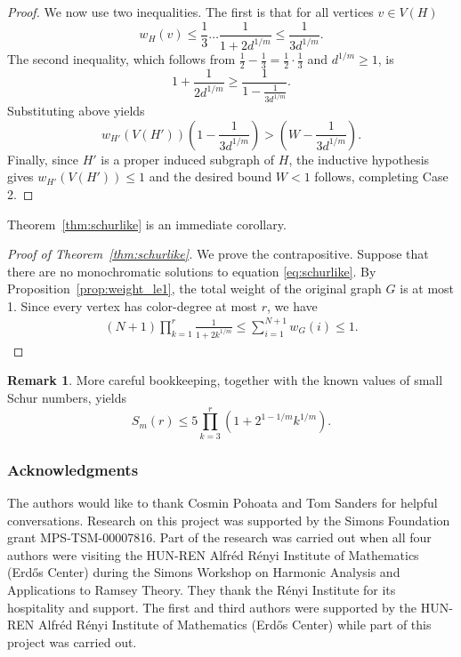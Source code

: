 \documentclass[11pt]{article}
\theoremstyle{plain}
\theoremstyle{definition}
\theoremstyle{definition}
\newtheorem*{remark}{Remark}
\theoremstyle{remark}
\begin{document}
\begin{proof}
 We now use two inequalities. The first is that for all vertices $v \in V(H)$
 \[
w_H(v) \leq \frac{1}{3} \dots \frac{1}{1+2 d^{1/m}} \leq \frac{1}{3 d^{1/m}}.
 \]
The second inequality, which follows from $\tfrac{1}{2}-\tfrac{1}{3} = \tfrac{1}{2} \cdot \tfrac{1}{3}$ and $d^{1/m} \ge 1$, is
\[
1+ \frac{1}{2 d^{1/m}} \geq \frac{1}{1-\frac{1}{3d^{1/m}}}.
\]
Substituting above yields
\[
w_{H'}(V(H')) \left(1-\frac{1}{3d^{1/m}}\right) > \left( W - \frac{1}{3 d^{1/m}}\right).
\]
Finally, since \(H'\) is a proper induced subgraph of \(H\), the inductive hypothesis gives \(w_{H'}(V(H')) \leq 1\) and the desired bound \(W<1\) follows, completing Case 2.


\end{proof}

Theorem~\ref{thm:schurlike} is an immediate corollary.

\begin{proof}[Proof of Theorem~\ref{thm:schurlike}]
We prove the contrapositive. Suppose that there are no monochromatic solutions to equation \eqref{eq:schurlike}. By Proposition~\ref{prop:weight_le1}, the total weight of the original graph $G$ is at most 1. Since every vertex has color-degree at most $r$, we have
\begin{align*}
    (N+1) \prod_{k=1}^r \frac{1}{1 + 2 k^{1/m}} \leq \sum_{i=1}^{N+1} w_G(i) \leq 1.
\end{align*}
\end{proof}


\begin{remark}
    More careful bookkeeping, together with the known values of small Schur numbers, yields 
    \[
    S_m(r) \leq 5 \prod_{k=3}^r (1 + 2^{1-1/m} k^{1/m}) .
    \]
\end{remark}

\subsubsection*{Acknowledgments}
The authors would like to thank Cosmin Pohoata and Tom Sanders for helpful conversations. Research on this project was supported by the Simons Foundation grant MPS-TSM-00007816. Part of the research was carried out when all four authors were visiting the HUN-REN Alfr\'ed R\'enyi Institute of Mathematics (Erd\H{o}s Center) during the Simons Workshop on Harmonic Analysis and Applications to Ramsey Theory. They thank the R\'enyi Institute for its hospitality and support. The first and third authors were supported by the HUN-REN Alfr\'ed R\'enyi Institute of Mathematics (Erd\H{o}s Center) while part of this project was carried out.
\end{document}
